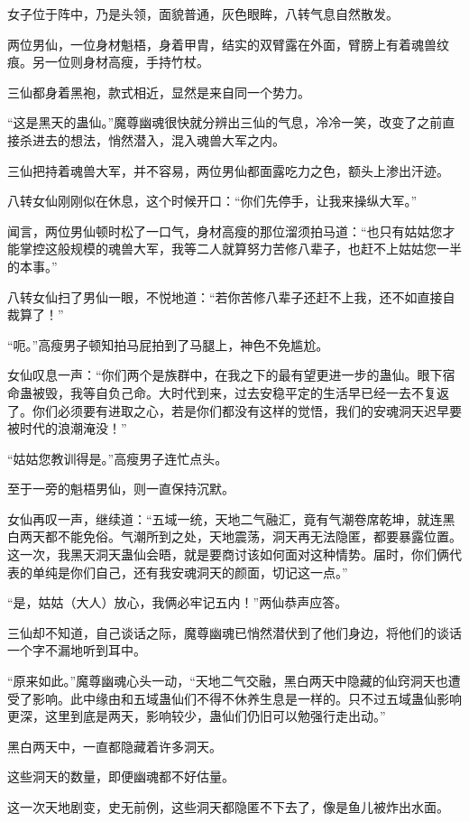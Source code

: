\begin{this_body}
女子位于阵中，乃是头领，面貌普通，灰色眼眸，八转气息自然散发。

两位男仙，一位身材魁梧，身着甲胄，结实的双臂露在外面，臂膀上有着魂兽纹痕。另一位则身材高瘦，手持竹杖。

三仙都身着黑袍，款式相近，显然是来自同一个势力。

“这是黑天的蛊仙。”魔尊幽魂很快就分辨出三仙的气息，冷冷一笑，改变了之前直接杀进去的想法，悄然潜入，混入魂兽大军之内。

三仙把持着魂兽大军，并不容易，两位男仙都面露吃力之色，额头上渗出汗迹。

八转女仙刚刚似在休息，这个时候开口：“你们先停手，让我来操纵大军。”

闻言，两位男仙顿时松了一口气，身材高瘦的那位溜须拍马道：“也只有姑姑您才能掌控这般规模的魂兽大军，我等二人就算努力苦修八辈子，也赶不上姑姑您一半的本事。”

八转女仙扫了男仙一眼，不悦地道：“若你苦修八辈子还赶不上我，还不如直接自裁算了！”

“呃。”高瘦男子顿知拍马屁拍到了马腿上，神色不免尴尬。

女仙叹息一声：“你们两个是族群中，在我之下的最有望更进一步的蛊仙。眼下宿命蛊被毁，我等自负己命。大时代到来，过去安稳平定的生活早已经一去不复返了。你们必须要有进取之心，若是你们都没有这样的觉悟，我们的安魂洞天迟早要被时代的浪潮淹没！”

“姑姑您教训得是。”高瘦男子连忙点头。

至于一旁的魁梧男仙，则一直保持沉默。

女仙再叹一声，继续道：“五域一统，天地二气融汇，竟有气潮卷席乾坤，就连黑白两天都不能免俗。气潮所到之处，天地震荡，洞天再无法隐匿，都要暴露位置。这一次，我黑天洞天蛊仙会晤，就是要商讨该如何面对这种情势。届时，你们俩代表的单纯是你们自己，还有我安魂洞天的颜面，切记这一点。”

“是，姑姑（大人）放心，我俩必牢记五内！”两仙恭声应答。

三仙却不知道，自己谈话之际，魔尊幽魂已悄然潜伏到了他们身边，将他们的谈话一个字不漏地听到耳中。

“原来如此。”魔尊幽魂心头一动，“天地二气交融，黑白两天中隐藏的仙窍洞天也遭受了影响。此中缘由和五域蛊仙们不得不休养生息是一样的。只不过五域蛊仙影响更深，这里到底是两天，影响较少，蛊仙们仍旧可以勉强行走出动。”

黑白两天中，一直都隐藏着许多洞天。

这些洞天的数量，即便幽魂都不好估量。

这一次天地剧变，史无前例，这些洞天都隐匿不下去了，像是鱼儿被炸出水面。


\end{this_body}
